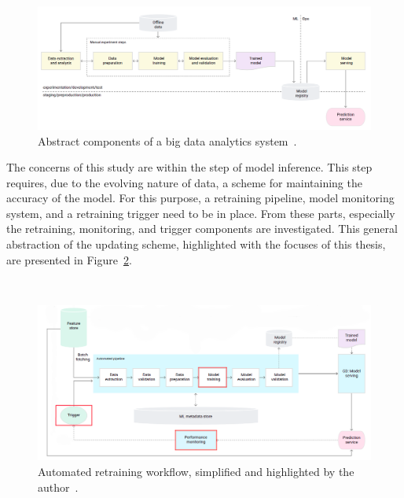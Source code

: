 \begin{figure}[hb]
\newline
\begin{center}
\includegraphics[width=1.0\columnwidth]{simplegoogle.png}
\caption{Abstract components of a big data analytics system~\cite{googlemlops}.}
\label{simplepipeline}
\end{center}
\end{figure}

The concerns of this study are within the step of model inference. This step requires, due to the evolving nature of data, a scheme for maintaining the accuracy of the model. For this purpose, a retraining pipeline, model monitoring system, and a retraining trigger need to be in place. From these parts, especially the retraining, monitoring, and trigger components are investigated. This general abstraction of the updating scheme, highlighted with the focuses of this thesis, are presented in Figure~\ref{triggerpipeline}.

\begin{figure}[ht]
\ \newline
\begin{center}
\includegraphics[width=1.0\columnwidth]{paivityssykli.png}
\caption{Automated retraining workflow, simplified and highlighted by the author~\cite{googlemlops}.}
\label{triggerpipeline}
\end{center}
\end{figure}



